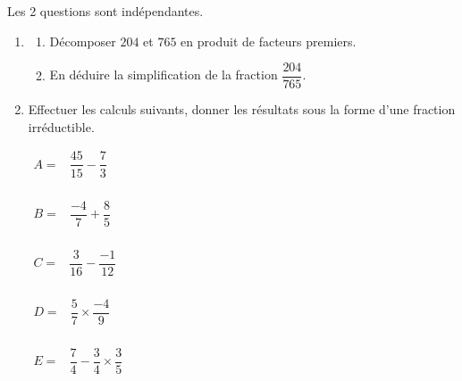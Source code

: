 \documentclass[a4paper]{book}
\begin{document}
{    \begin{exercice}
        Les 2 questions sont indépendantes.
        \begin{enumerate}[leftmargin=*]
            \item \begin{enumerate}
                \item Décomposer $204$ et $765$ en produit de facteurs premiers.

                \item En déduire la simplification de la fraction $\dfrac{204}{765}$.
            \end{enumerate}

            \item Effectuer les calculs suivants, donner les résultats sous la forme d'une fraction irréductible.
            
            \begin{minipage}{0.18\linewidth}
                $\begin{array}{ll}
                    A = & \dfrac{45}{15}-\dfrac{7}{3} \\[1ex]
                \end{array}$
            \end{minipage}
            \hfill
            \begin{minipage}{0.18\linewidth}
                $\begin{array}{ll}
                    B = & \dfrac{-4}{7}+\dfrac{8}{5} \\[1ex]
                \end{array}$    
            \end{minipage}
            \hfill
            \begin{minipage}[t]{0.18\linewidth}
                $\begin{array}{ll}
                    C = & \dfrac{3}{16}-\dfrac{-1}{12} \\[1ex]
                \end{array}$
            \end{minipage}
            \hfill
            \begin{minipage}[t]{0.18\linewidth}
                $\begin{array}{ll}
                    D = & \dfrac{5}{7}\times\dfrac{-4}{9} \\[1ex]
                \end{array}$
            \end{minipage}
            \hfill
            \begin{minipage}{0.18\linewidth}
                $\begin{array}{ll}
                    E = & \dfrac{7}{4}-\dfrac{3}{4}\times\dfrac{3}{5} \\[1ex]
                \end{array}$
            \end{minipage} 
        \end{enumerate}
    \end{exercice}


}
\end{document}
